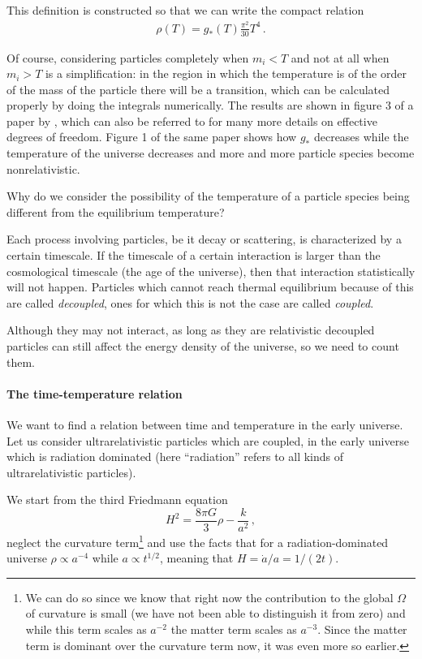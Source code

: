 \documentclass[main.tex]{subfiles}
\begin{document}
This definition is constructed so that we can write the compact relation 
%
\begin{align} \label{eq:radiation-energy-density-effective-dof}
\rho (T) = g_*(T) \frac{\pi^2}{30} T^{4}
\,.
\end{align}

Of course, considering particles completely when \(m_i < T\) and not at all when \(m_i > T\) is a simplification: in the region in which the temperature is of the order of the mass of the particle there will be a transition, which can be calculated properly by doing the integrals numerically. The results are shown in figure 3 of a paper by \textcite[]{husdalEffectiveDegreesFreedom2016}, which can also be referred to for many more details on effective degrees of freedom.
Figure 1 of the same paper shows how \(g_*\) decreases while the temperature of the universe decreases and more and more particle species become nonrelativistic. 

Why do we consider the possibility of the temperature of a particle species being different from the equilibrium temperature?
 
Each process involving particles, be it decay or scattering, is characterized by a certain timescale.
If the timescale of a certain interaction is larger than the cosmological timescale (the age of the universe), then that interaction statistically will not happen.
Particles which cannot reach thermal equilibrium because of this are called \emph{decoupled}, ones for which this is not the case are called \emph{coupled}.

Although they may not interact, as long as they are relativistic decoupled particles can still affect the energy density of the universe, so we need to count them. 

\paragraph{The time-temperature relation}

We want to find a relation between time and temperature in the early universe.
Let us consider ultrarelativistic particles which are coupled, in the early universe which is radiation dominated (here ``radiation'' refers to all kinds of ultrarelativistic particles). 


We start from the third Friedmann equation
%
\begin{equation}
  H^2= \frac{8 \pi G}{3} \rho - \frac{k}{a^2}
\,,
\end{equation}
%
neglect the curvature term\footnote{We can do so since we know that right now the contribution to the global \(\Omega \) of curvature is small (we have not been able to distinguish it from zero) and while this term scales as \(a^{-2}\) the matter term scales as \(a^{-3}\). Since the matter term is dominant over the curvature term now, it was even more so earlier.} and use the facts that for a radiation-dominated universe \(\rho \propto a^{-4}\) while \(a \propto t^{1/2}\), meaning that \(H = \dot{a} / a =  1/ (2t)\).
\end{document}

